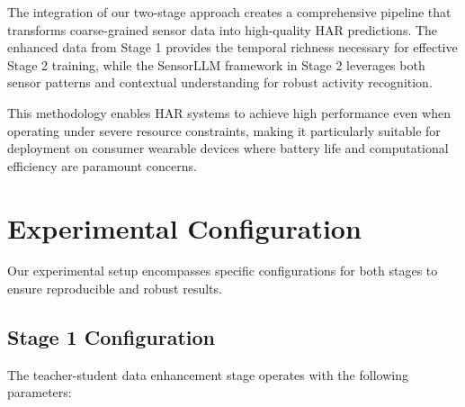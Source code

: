 \hspace{2em}The integration of our two-stage approach creates a comprehensive pipeline that transforms coarse-grained sensor data into high-quality HAR predictions. The enhanced data from Stage 1 provides the temporal richness necessary for effective Stage 2 training, while the SensorLLM framework in Stage 2 leverages both sensor patterns and contextual understanding for robust activity recognition.

\hspace{2em}This methodology enables HAR systems to achieve high performance even when operating under severe resource constraints, making it particularly suitable for deployment on consumer wearable devices where battery life and computational efficiency are paramount concerns.

\section{Experimental Configuration}

\hspace{2em}Our experimental setup encompasses specific configurations for both stages to ensure reproducible and robust results.

\subsection{Stage 1 Configuration}

\hspace{2em}The teacher-student data enhancement stage operates with the following parameters:

